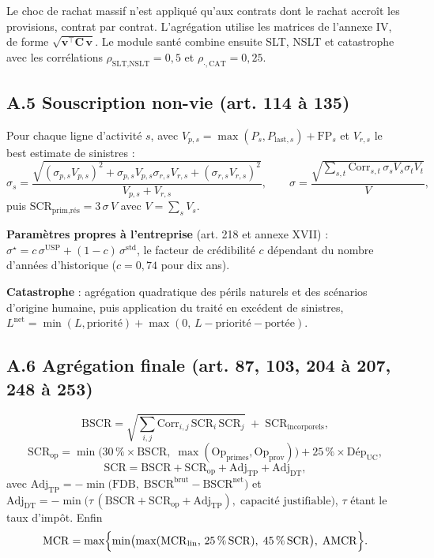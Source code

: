 Le choc de rachat massif n'est appliqué qu'aux contrats dont le rachat accroît les provisions,
contrat par contrat. L'agrégation utilise les matrices de l'annexe IV, de forme
$\sqrt{\mathbf{v}^{\top}\mathbf{C}\,\mathbf{v}}$. Le module santé combine ensuite SLT, NSLT et
catastrophe avec les corrélations $\rho_{\text{SLT,NSLT}} = 0{,}5$ et
$\rho_{\cdot,\text{CAT}} = 0{,}25$.

\subsection*{A.5 Souscription non-vie (art. 114 à 135)}

Pour chaque ligne d'activité $s$, avec $V_{p,s} = \max(P_s, P_{\text{last},s}) + \mathrm{FP}_s$
et $V_{r,s}$ le best estimate de sinistres :
\[
\sigma_s = \frac{\sqrt{(\sigma_{p,s}V_{p,s})^2 + \sigma_{p,s}V_{p,s}\sigma_{r,s}V_{r,s}
+ (\sigma_{r,s}V_{r,s})^2}}{V_{p,s}+V_{r,s}},
\qquad
\sigma = \frac{\sqrt{\sum_{s,t}\mathrm{Corr}_{s,t}\,\sigma_s V_s \sigma_t V_t}}{V},
\]
puis $\mathrm{SCR}_{\text{prim,rés}} = 3\,\sigma\,V$ avec $V = \sum_s V_s$.

\textbf{Paramètres propres à l'entreprise} (art. 218 et annexe XVII) :
$\sigma^{\star} = c\,\sigma^{\mathrm{USP}} + (1-c)\,\sigma^{\text{std}}$, le facteur de
crédibilité $c$ dépendant du nombre d'années d'historique ($c = 0{,}74$ pour dix ans).

\textbf{Catastrophe} : agrégation quadratique des périls naturels et des scénarios d'origine
humaine, puis application du traité en excédent de sinistres,
$L^{\text{net}} = \min(L, \text{priorité}) + \max(0,\, L - \text{priorité} - \text{portée})$.

\subsection*{A.6 Agrégation finale (art. 87, 103, 204 à 207, 248 à 253)}

\[
\mathrm{BSCR} = \sqrt{\sum_{i,j}\mathrm{Corr}_{i,j}\,\mathrm{SCR}_i\,\mathrm{SCR}_j}
\;+\; \mathrm{SCR}_{\text{incorporels}},
\]
\[
\mathrm{SCR}_{\text{op}} = \min\bigl(30\,\%\times\mathrm{BSCR},\;
\max(\mathrm{Op}_{\text{primes}}, \mathrm{Op}_{\text{prov}})\bigr)
+ 25\,\%\times \mathrm{Dép}_{\text{UC}},
\]
\[
\mathrm{SCR} = \mathrm{BSCR} + \mathrm{SCR}_{\text{op}}
+ \mathrm{Adj}_{\mathrm{TP}} + \mathrm{Adj}_{\mathrm{DT}},
\]
avec $\mathrm{Adj}_{\mathrm{TP}} = -\min\bigl(\mathrm{FDB},\;
\mathrm{BSCR}^{\text{brut}} - \mathrm{BSCR}^{\text{net}}\bigr)$ et
$\mathrm{Adj}_{\mathrm{DT}} = -\min\bigl(\tau\,(\mathrm{BSCR} + \mathrm{SCR}_{\text{op}}
+ \mathrm{Adj}_{\mathrm{TP}}),\; \text{capacité justifiable}\bigr)$, $\tau$ étant le taux
d'impôt. Enfin
\[
\mathrm{MCR} = \max\Bigl\{\min\bigl(\max(\mathrm{MCR}_{\text{lin}},\,25\,\%\,\mathrm{SCR}),\;
45\,\%\,\mathrm{SCR}\bigr),\; \mathrm{AMCR}\Bigr\}.
\]

